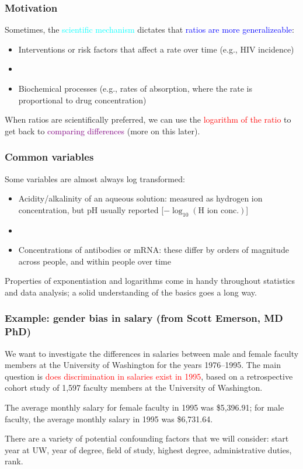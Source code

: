 \documentclass[11pt]{beamer}
\newcommand{\myframe}[1]{\begin{frame} \frametitle{#1}}
\begin{document}
\myframe{Motivation}
Sometimes, the \textcolor{cyan}{scientific mechanism} dictates that \textcolor{blue}{ratios are more generalizeable}:
{\fontsize{10pt}{7.2}\selectfont
\begin{itemize}
\item Interventions or risk factors that affect a rate over time (e.g., HIV incidence)
\item[]
\item Biochemical processes (e.g., rates of absorption, where the rate is proportional to drug concentration) 
\end{itemize}
}

When ratios are scientifically preferred, we can use the \textcolor{red}{logarithm of the ratio} to get back to \textcolor{purple}{comparing differences} (more on this later).
\end{frame}

\myframe{Common variables}
Some variables are almost always log transformed:
\begin{itemize}
\item Acidity/alkalinity of an aqueous solution: measured as hydrogen ion concentration, but pH usually reported [$-\log_{10}(\text{H ion conc.})$]
\item[]
\item Concentrations of antibodies or mRNA: these differ by orders of magnitude across people, and within people over time
\end{itemize}

Properties of exponentiation and logarithms come in handy throughout statistics and data analysis; a solid understanding of the basics goes a long way.
\end{frame}

\myframe{Example: gender bias in salary {\small (from Scott Emerson, MD PhD)}}
We want to investigate the differences in salaries between male and female faculty members at the University of Washington for the years 1976--1995. The main question is \textcolor{red}{does discrimination in salaries exist in 1995}, based on a retrospective cohort study of 1,597 faculty members at the University of Washington.

The average monthly salary for female faculty in 1995 was \$5,396.91; for male faculty, the average monthly salary in 1995 was \$6,731.64.

There are a variety of potential confounding factors that we will consider: start year at UW, year of degree, field of study, highest degree, administrative duties, rank.
\end{frame}
\end{document}
